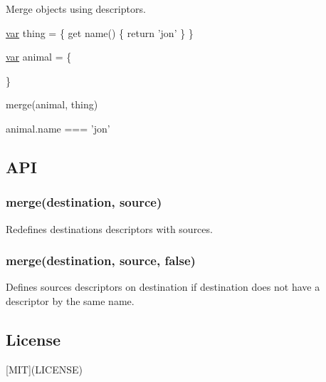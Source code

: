 Merge objects using descriptors.


\begin{DoxyCode}
\hyperlink{018__def_8c_a335628f2e9085305224b4f9cc6e95ed5}{var} thing = \{
  \textcolor{keyword}{get} name() \{
    \textcolor{keywordflow}{return} \textcolor{stringliteral}{'jon'}
  \}
\}

\hyperlink{018__def_8c_a335628f2e9085305224b4f9cc6e95ed5}{var} animal = \{

\}

merge(animal, thing)

animal.name === 'jon'
\end{DoxyCode}


\subsection*{A\+P\+I}

\subsubsection*{merge(destination, source)}

Redefines {\ttfamily destination}\textquotesingle{}s descriptors with {\ttfamily source}\textquotesingle{}s.

\subsubsection*{merge(destination, source, false)}

Defines {\ttfamily source}\textquotesingle{}s descriptors on {\ttfamily destination} if {\ttfamily destination} does not have a descriptor by the same name.

\subsection*{License}

\mbox{[}M\+I\+T\mbox{]}(L\+I\+C\+E\+N\+S\+E) 